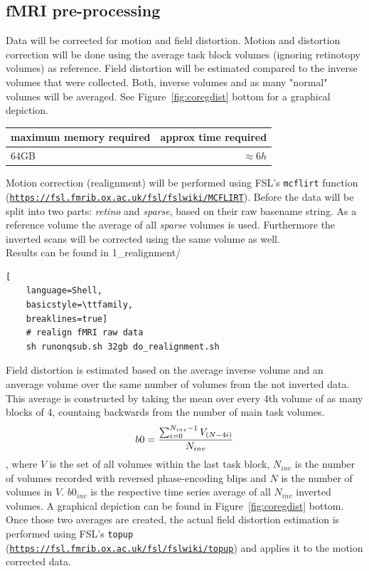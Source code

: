 \documentclass[12pt,a4paper]{scrartcl}
\begin{document}
\subsection{fMRI pre-processing}
Data will be corrected for motion and field distortion. Motion and distortion correction will be done using the average task block volumes (ignoring retinotopy volumes) as reference. Field distortion will be estimated compared to the inverse volumes that were collected. Both, inverse volumes and as many "normal" volumes will be averaged. See Figure~\ref{fig:coregdist} bottom for a graphical depiction.
\begin{table}[h]
\begin{tabular}{l | r}
\toprule
maximum memory required & approx time required\\\toprule
64GB & $\approx 6h$ \\\bottomrule
\end{tabular}
\end{table}
\FloatBarrier
\noindent Motion correction (realignment) will be performed using FSL's \texttt{mcflirt} function (\href{https://fsl.fmrib.ox.ac.uk/fsl/fslwiki/MCFLIRT}{\nolinkurl{https://fsl.fmrib.ox.ac.uk/fsl/fslwiki/MCFLIRT}}). Before the data will be split into two parts: \textit{retino} and  \textit{sparse}, based on their raw basename string. As a reference volume the average of all \textit{sparse} volumes is used. Furthermore the inverted scans will be corrected using the same volume as well.\\

\noindent Results can be found in 1\_realignment/\\
\begin{lstlisting}[
    language=Shell,
    basicstyle=\ttfamily,
    breaklines=true]
    # realign fMRI raw data
    sh runonqsub.sh 32gb do_realignment.sh
\end{lstlisting}
Field distortion is estimated based on the average inverse volume and an anverage volume over the same number of volumes from the not inverted data. This average is constructed by taking the mean over every 4th volume of as many blocks of 4, countaing backwards from the number of main task volumes.
\begin{equation}
\centering
b0=\frac{\sum_{i=0}^{N_{inv}-1}V_{(N-4i)}}{N_{inv}}
\end{equation}
\noindent, where $V$ is the set of all volumes within the last task block, $N_{inv}$ is the number of volumes recorded with reversed phase-encoding blips and $N$ is the number of volumes in $V$. $b0_{inv}$ is the respective time series average of all $N_{inv}$ inverted volumes. A graphical depiction can be found in Figure~\ref{fig:coregdist} bottom. Once those two averages are created, the actual field distortion estimation is performed using FSL's \texttt{topup} (\href{https://fsl.fmrib.ox.ac.uk/fsl/fslwiki/topup}{\nolinkurl{https://fsl.fmrib.ox.ac.uk/fsl/fslwiki/topup}}) and applies it to the motion corrected data.\\
\end{document}
